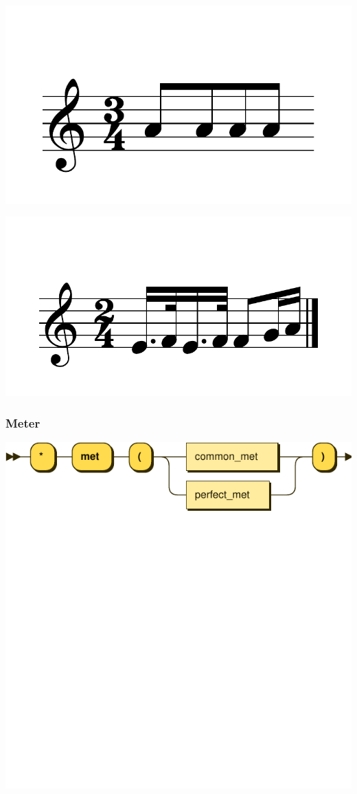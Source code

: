 \documentclass{article}
\begin{document}
\includegraphics[scale=0.5]{figures_tests/pdf/skern/beaming2.pdf}

\includegraphics[scale=0.5]{figures_tests/pdf/skern/partialbeaming0.pdf}


\subsubsection{Meter}


\includegraphics[scale=0.5]{figures_railroad/pdf/skern/meter.pdf}
\end{document}
